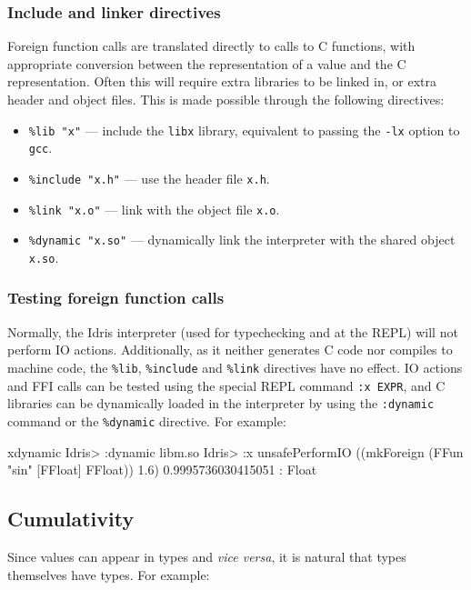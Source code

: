 \subsubsection*{Include and linker directives}

Foreign function calls are translated directly to calls to C functions, with appropriate
conversion between the \Idris{} representation of a value and the C representation.
Often this will require extra libraries to be linked in, or extra header and object files.
This is made possible through the following directives:

\begin{itemize}
\item \texttt{\%lib "x"} --- include the \texttt{libx} library, equivalent to passing the
\texttt{-lx} option to \texttt{gcc}.
\item \texttt{\%include "x.h"} --- use the header file \texttt{x.h}.
\item \texttt{\%link "x.o"} --- link with the object file \texttt{x.o}.
\item \texttt{\%dynamic "x.so"} --- dynamically link the interpreter with the shared object \texttt{x.so}.
\end{itemize}

\subsubsection*{Testing foreign function calls}
Normally, the Idris interpreter (used for typechecking and at the REPL) will
not perform IO actions.  Additionally, as it neither generates C code nor
compiles to machine code, the \texttt{\%lib}, \texttt{\%include} and
\texttt{\%link} directives have no effect. IO actions and FFI calls can be
tested using the special REPL command \texttt{:x EXPR}, and C libraries can be
dynamically loaded in the interpreter by using the \texttt{:dynamic} command
or the \texttt{\%dynamic} directive. For example:

\begin{SaveVerbatim}{xdynamic}
Idris> :dynamic libm.so
Idris> :x unsafePerformIO ((mkForeign (FFun "sin" [FFloat] FFloat)) 1.6)
0.9995736030415051 : Float
\end{SaveVerbatim}
\subsection{Cumulativity}

Since values can appear in types and \emph{vice versa}, it is natural that types themselves
have types. For example:

